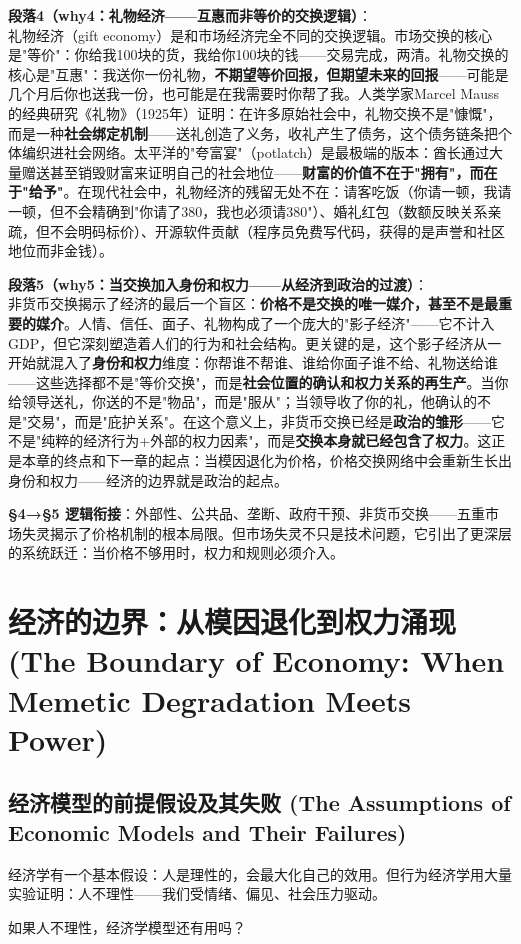 \documentclass[../main.tex]{subfiles}
\begin{document}
	\textbf{段落4（why4：礼物经济——互惠而非等价的交换逻辑）}：\\
	礼物经济（gift economy）是和市场经济完全不同的交换逻辑。市场交换的核心是"等价"：你给我100块的货，我给你100块的钱——交易完成，两清。礼物交换的核心是"互惠"：我送你一份礼物，\textbf{不期望等价回报，但期望未来的回报}——可能是几个月后你也送我一份，也可能是在我需要时你帮了我。人类学家Marcel Mauss的经典研究《礼物》（1925年）证明：在许多原始社会中，礼物交换不是"慷慨"，而是一种\textbf{社会绑定机制}——送礼创造了义务，收礼产生了债务，这个债务链条把个体编织进社会网络。太平洋的"夸富宴"（potlatch）是最极端的版本：酋长通过大量赠送甚至销毁财富来证明自己的社会地位——\textbf{财富的价值不在于"拥有"，而在于"给予"}。在现代社会中，礼物经济的残留无处不在：请客吃饭（你请一顿，我请一顿，但不会精确到"你请了380，我也必须请380"）、婚礼红包（数额反映关系亲疏，但不会明码标价）、开源软件贡献（程序员免费写代码，获得的是声誉和社区地位而非金钱）。

	\textbf{段落5（why5：当交换加入身份和权力——从经济到政治的过渡）}：\\
		非货币交换揭示了经济的最后一个盲区：\textbf{价格不是交换的唯一媒介，甚至不是最重要的媒介}。人情、信任、面子、礼物构成了一个庞大的"影子经济"——它不计入GDP，但它深刻塑造着人们的行为和社会结构。更关键的是，这个影子经济从一开始就混入了\textbf{身份和权力}维度：你帮谁不帮谁、谁给你面子谁不给、礼物送给谁——这些选择都不是"等价交换"，而是\textbf{社会位置的确认和权力关系的再生产}。当你给领导送礼，你送的不是"物品"，而是"服从"；当领导收了你的礼，他确认的不是"交易"，而是"庇护关系"。在这个意义上，非货币交换已经是\textbf{政治的雏形}——它不是"纯粹的经济行为+外部的权力因素"，而是\textbf{交换本身就已经包含了权力}。这正是本章的终点和下一章的起点：当模因退化为价格，价格交换网络中会重新生长出身份和权力——经济的边界就是政治的起点。

	\textbf{§4→§5 逻辑衔接}：外部性、公共品、垄断、政府干预、非货币交换——五重市场失灵揭示了价格机制的根本局限。但市场失灵不只是技术问题，它引出了更深层的系统跃迁：当价格不够用时，权力和规则必须介入。

	\section{经济的边界：从模因退化到权力涌现 (The Boundary of Economy: When Memetic Degradation Meets Power)}

	\subsection{经济模型的前提假设及其失败 (The Assumptions of Economic Models and Their Failures)}
	\begin{motivation}
		经济学有一个基本假设：人是理性的，会最大化自己的效用。但行为经济学用大量实验证明：人不理性——我们受情绪、偏见、社会压力驱动。
	\end{motivation}
	\begin{questionbox}
		如果人不理性，经济学模型还有用吗？
	\end{questionbox}
\end{document}

